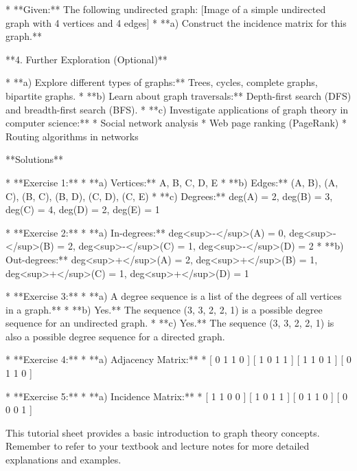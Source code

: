 *   **Given:** The following undirected graph:
      [Image of a simple undirected graph with 4 vertices and 4 edges]
*   **a) Construct the incidence matrix for this graph.**

**4. Further Exploration (Optional)**

*   **a) Explore different types of graphs:** Trees, cycles, complete graphs, bipartite graphs.
*   **b) Learn about graph traversals:** Depth-first search (DFS) and breadth-first search (BFS).
*   **c) Investigate applications of graph theory in computer science:** 
      *   Social network analysis
      *   Web page ranking (PageRank)
      *   Routing algorithms in networks

**Solutions**

*   **Exercise 1:** 
      *   **a) Vertices:** {A, B, C, D, E}
      *   **b) Edges:** {(A, B), (A, C), (B, C), (B, D), (C, D), (C, E)}
      *   **c) Degrees:** deg(A) = 2, deg(B) = 3, deg(C) = 4, deg(D) = 2, deg(E) = 1

*   **Exercise 2:** 
      *   **a) In-degrees:** deg<sup>-</sup>(A) = 0, deg<sup>-</sup>(B) = 2, deg<sup>-</sup>(C) = 1, deg<sup>-</sup>(D) = 2
      *   **b) Out-degrees:** deg<sup>+</sup>(A) = 2, deg<sup>+</sup>(B) = 1, deg<sup>+</sup>(C) = 1, deg<sup>+</sup>(D) = 1

*   **Exercise 3:**
      *   **a) A degree sequence is a list of the degrees of all vertices in a graph.**
      *   **b) Yes.** The sequence (3, 3, 2, 2, 1) is a possible degree sequence for an undirected graph.
      *   **c) Yes.** The sequence (3, 3, 2, 2, 1) is also a possible degree sequence for a directed graph.

*   **Exercise 4:**
      *   **a) Adjacency Matrix:** 
          *   [ 0 1 1 0 ]
             [ 1 0 1 1 ]
             [ 1 1 0 1 ]
             [ 0 1 1 0 ] 

*   **Exercise 5:**
      *   **a) Incidence Matrix:** 
          *   [ 1 1 0 0 ]
             [ 1 0 1 1 ]
             [ 0 1 1 0 ]
             [ 0 0 0 1 ]

This tutorial sheet provides a basic introduction to graph theory concepts. Remember to refer to your textbook and lecture notes for more detailed explanations and examples.
